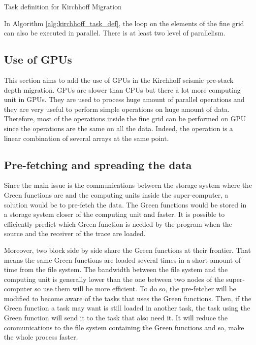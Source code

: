 \begin{algorithm}[h]
	\DontPrintSemicolon
	\SetAlgoVlined
	\caption{Task definition for Kirchhoff Migration \label{alg:kirchhoff_task_def}}

\end{algorithm}

In Algorithm \ref{alg:kirchhoff_task_def}, the loop on the elements of the fine grid can also be executed in parallel.
There is at least two level of parallelism.


\subsection{Use of GPUs}
This section aims to add the use of GPUs in the Kirchhoff seismic pre-stack depth migration.
GPUs are slower than CPUs but there a lot more computing unit in GPUs.
They are used to process huge amount of parallel operations and they are very useful to perform simple operations on huge amount of data.
Therefore, most of the operations inside the fine grid can be performed on GPU since the operations are the same on all the data.
Indeed, the operation is a linear combination of several arrays at the same point.

\subsection{Pre-fetching and spreading the data}
Since the main issue is the communications between the storage system where the Green functions are and the computing units inside the super-computer, a solution would be to pre-fetch the data.
The Green functions would be stored in a storage system closer of the computing unit and faster.
It is possible to efficiently predict which Green function is needed by the program when the source and the receiver of the trace are loaded.

Moreover, two block side by side share the Green functions at their frontier.
That means the same Green functions are loaded several times in a short amount of time from the file system.
The bandwidth between the file system and the computing unit is generally lower than the one between two nodes of the super-computer so use them will be more efficient.
To do so, the pre-fetcher will be modified to become aware of the tasks that uses the Green functions.
Then, if the Green function a task may want is still loaded in another task, the task using the Green function will send it to the task that also need it.
It will reduce the communications to the file system containing the Green functions and so, make the whole process faster.

